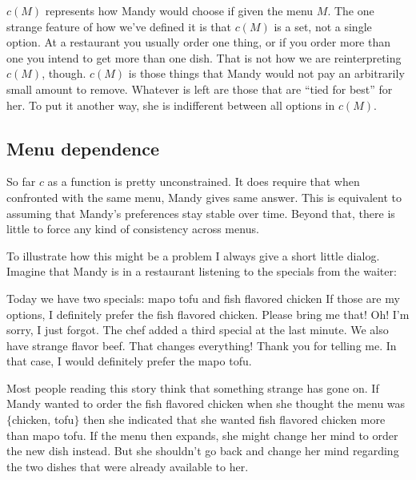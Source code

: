 
$c(M)$ represents how Mandy would choose if given the menu $M$.  The one strange feature of how we've defined it is that $c(M)$ is a set, not a single option.  At a restaurant you usually order one thing, or if you order more than one you intend to get more than one dish.  That is not how we are reinterpreting $c(M)$, though.  $c(M)$ is those things that Mandy would not pay an arbitrarily small amount to remove.  Whatever is left are those that are ``tied for best'' for her.  To put it another way, she is indifferent between all options in $c(M)$.

\subsection{Menu dependence}

So far $c$ as a function is pretty unconstrained. It does require that when confronted with the same menu, Mandy gives same answer.  This is equivalent to assuming that Mandy's preferences stay stable over time.  Beyond that, there is little to force any kind of consistency across menus.  

To illustrate how this might be a problem I always give a short little dialog.  Imagine that Mandy is in a restaurant listening to the specials from the waiter:

\begin{dialogue}
 Today we have two specials: mapo tofu and fish flavored chicken
 If those are my options, I definitely prefer the fish flavored chicken.  Please bring me that!
 Oh! I'm sorry, I just forgot. The chef added a third special at the last minute.  We also have strange flavor beef.  
  That changes everything!  Thank you for telling me. In that case, I would definitely prefer the mapo tofu.
\end{dialogue}

Most people reading this story think that something strange has gone on.  If Mandy wanted to order the fish flavored chicken when she thought the menu was $\{$chicken, tofu$\}$ then she indicated that she wanted fish flavored chicken more than mapo tofu. If the menu then expands, she might change her mind to order the new dish instead.  But she shouldn't go back and change her mind regarding the two dishes that were already available to her.


